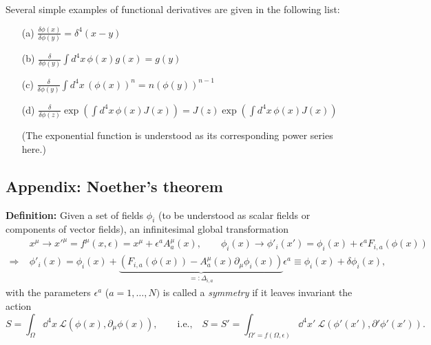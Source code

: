\documentclass[11pt]{latex/exercise}
\begin{document}
Several simple examples of functional derivatives are given in the following list:
\begin{itemize}
    \item[(a)] $\frac{\delta \phi(x)}{\delta \phi(y)} =  \delta^4(x-y)$
    \item[(b)] $\frac{\delta}{\delta \phi(y)} \int d^4 x\, \phi(x) g(x) = g(y)$
    \item[(c)] $\frac{\delta}{\delta \phi(y)} \int d^4 x\, (\phi(x))^n = n (\phi(y))^{n-1}$
    \item[(d)] $\frac{\delta}{\delta\phi\left(z\right)}\exp\left(\int d^4 x\,\phi\left(x\right)J\left(x\right)\right) = J(z) \exp\left(\int d^4 x\,\phi\left(x\right)J\left(x\right)\right)$

          (The exponential function is understood as its corresponding power series here.)
\end{itemize}

\subsection*{Appendix: Noether's theorem}
\label{B:Apendix}
\textbf{Definition:} Given a set of fields $\phi_i$ (to be understood as scalar fields or components of vector fields), an infinitesimal global transformation
\begin{equation}
    \label{transformation}
    \begin{split}
                       & x^\mu \rightarrow x'^\mu = f^\mu(x, \epsilon) = x^\mu + \epsilon^a A^\mu_a (x) , \qquad \phi_i (x) \rightarrow \phi'_i (x') = \phi_i (x) + \epsilon^a F_{i,a} (\phi(x)) \\
        \Rightarrow \; & \phi'_i (x) = \phi_i (x) + \underbrace{\left( F_{i,a} (\phi(x)) - A^\mu_a (x) \partial_\mu \phi_i (x) \right)}_{\displaystyle =: \Delta_{i,a}} \epsilon^a
        \equiv \phi_i (x) + \delta \phi_i (x),
    \end{split}
\end{equation}
with the parameters $\epsilon^a$ ($a = 1, \dots, N)$ is called a \textit{symmetry} if it leaves invariant the action
\begin{equation}
    \label{eq:action_invariance}
    S = \int_{\Omega} \dd^4 x \: \mathcal{L}(\phi(x), \partial_\mu \phi(x)) , \qquad \text{i.e.,} \quad
    S = S'
    = \int_{\Omega' = f(\Omega, \epsilon)} \dd^4 x' \: \mathcal{L}(\phi'(x'), \partial' \phi'(x')).
\end{equation}
\end{document}
